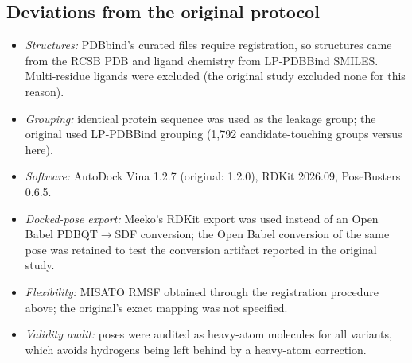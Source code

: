\subsection{Deviations from the original protocol}\label{sec:deviations}
\begin{itemize}
\item \emph{Structures:} PDBbind's curated files require registration, so structures came from the RCSB PDB and ligand
      chemistry from LP-PDBBind SMILES. Multi-residue ligands were excluded (the original study excluded none for this
      reason).
\item \emph{Grouping:} identical protein sequence was used as the leakage group; the original used LP-PDBBind grouping
      (1{,}792 candidate-touching groups versus \TouchedGroups{} here).
\item \emph{Software:} AutoDock Vina 1.2.7 (original: 1.2.0), RDKit 2026.09, PoseBusters 0.6.5.
\item \emph{Docked-pose export:} Meeko's RDKit export was used instead of an Open Babel PDBQT$\to$SDF conversion; the
      Open Babel conversion of the same pose was retained to test the conversion artifact reported in the original study.
\item \emph{Flexibility:} MISATO RMSF obtained through the registration procedure above; the original's exact mapping
      was not specified.
\item \emph{Validity audit:} poses were audited as heavy-atom molecules for all variants, which avoids hydrogens being
      left behind by a heavy-atom correction.
\end{itemize}
